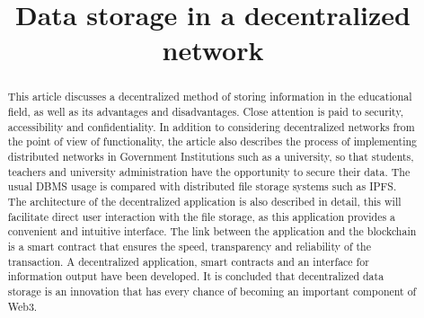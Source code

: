 \documentclass[10pt,conference,a4paper]{IEEEtran_EDM}
\def\confheader{}
\begin{document}
\markboth{\confheader}{}
\title{Data storage in a decentralized network}

\author{
\and

}

\maketitle


\begin{abstract}
This article discusses a decentralized method of storing information in the educational field, as well as its advantages and disadvantages. Close attention is paid to security, accessibility and confidentiality. In addition to considering decentralized networks from the point of view of functionality, the article also describes the process of implementing distributed networks in Government Institutions such as a university, so that students, teachers and university administration have the opportunity to secure their data. The usual DBMS usage is compared with distributed file storage systems such as IPFS. The architecture of the decentralized application is also described in detail, this will facilitate direct user interaction with the file storage, as this application provides a convenient and intuitive interface. The link between the application and the blockchain is a smart contract that ensures the speed, transparency and reliability of the transaction. A decentralized application, smart contracts and an interface for information output have been developed. It is concluded that decentralized data storage is an innovation that has every chance of becoming an important component of Web3.

\end{abstract}
\end{document}
